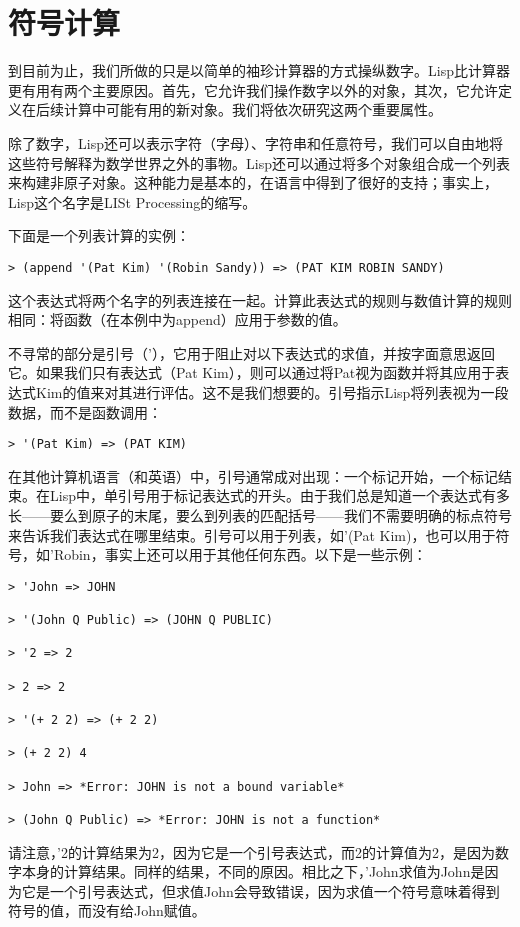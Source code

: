 \section{符号计算}
到目前为止，我们所做的只是以简单的袖珍计算器的方式操纵数字。Lisp比计算器更有用有两个主要原因。首先，它允许我们操作数字以外的对象，其次，它允许定义在后续计算中可能有用的新对象。我们将依次研究这两个重要属性。

除了数字，Lisp还可以表示字符（字母）、字符串和任意符号，我们可以自由地将这些符号解释为数学世界之外的事物。Lisp还可以通过将多个对象组合成一个列表来构建非原子对象。这种能力是基本的，在语言中得到了很好的支持；事实上，Lisp这个名字是LISt Processing的缩写。

下面是一个列表计算的实例：
\begin{lstlisting}[frame=shadowbox]
> (append '(Pat Kim) '(Robin Sandy)) => (PAT KIM ROBIN SANDY)
\end{lstlisting}
这个表达式将两个名字的列表连接在一起。计算此表达式的规则与数值计算的规则相同：将函数（在本例中为append）应用于参数的值。

不寻常的部分是引号（'），它用于阻止对以下表达式的求值，并按字面意思返回它。如果我们只有表达式（Pat Kim），则可以通过将Pat视为函数并将其应用于表达式Kim的值来对其进行评估。这不是我们想要的。引号指示Lisp将列表视为一段数据，而不是函数调用：
\begin{lstlisting}[frame=shadowbox]
> '(Pat Kim) => (PAT KIM)
\end{lstlisting}
在其他计算机语言（和英语）中，引号通常成对出现：一个标记开始，一个标记结束。在Lisp中，单引号用于标记表达式的开头。由于我们总是知道一个表达式有多长——要么到原子的末尾，要么到列表的匹配括号——我们不需要明确的标点符号来告诉我们表达式在哪里结束。引号可以用于列表，如'(Pat Kim)，也可以用于符号，如'Robin，事实上还可以用于其他任何东西。以下是一些示例：
\begin{lstlisting}[frame=shadowbox]
> 'John => JOHN

> '(John Q Public) => (JOHN Q PUBLIC)

> '2 => 2

> 2 => 2

> '(+ 2 2) => (+ 2 2)

> (+ 2 2) 4

> John => *Error: JOHN is not a bound variable*

> (John Q Public) => *Error: JOHN is not a function*
\end{lstlisting}
请注意，'2的计算结果为2，因为它是一个引号表达式，而2的计算值为2，是因为数字本身的计算结果。同样的结果，不同的原因。相比之下，'John求值为John是因为它是一个引号表达式，但求值John会导致错误，因为求值一个符号意味着得到符号的值，而没有给John赋值。

